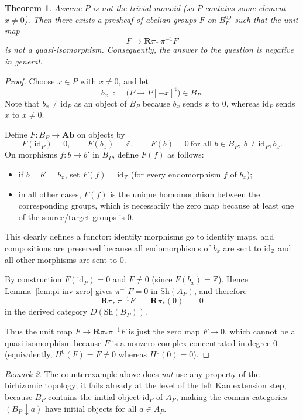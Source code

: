 \documentclass[11pt]{article}
\newtheorem{theorem}{Theorem}
\theoremstyle{remark}
\newtheorem{remark}[theorem]{Remark}
\begin{document}
\begin{theorem}\label{thm:counterexample}
Assume $P$ is not the trivial monoid (so $P$ contains some element $x\neq 0$).
Then there exists a presheaf of abelian groups $F$ on $B_P^{\mathrm{op}}$
such that the unit map
\[
F \longrightarrow \mathbf{R}\pi_*\,\pi^{-1}F
\]
is \emph{not} a quasi-isomorphism. Consequently, the answer to the question is \emph{negative in general}.
\end{theorem}

\begin{proof}
Choose $x\in P$ with $x\neq 0$, and let
\[
b_x \;:=\;\bigl(P\to P[-x]^\sharp\bigr)\in B_P.
\]
Note that $b_x\neq \mathrm{id}_P$ as an object of $B_P$ because $b_x$ sends $x$ to $0$, whereas
$\mathrm{id}_P$ sends $x$ to $x\neq 0$.

Define $F\colon B_P\to \mathbf{Ab}$ on objects by
\[
F(\mathrm{id}_P)=0,\qquad F(b_x)=\mathbb{Z},\qquad F(b)=0\ \text{for all }b\in B_P,\ b\neq \mathrm{id}_P,b_x.
\]
On morphisms $f\colon b\to b'$ in $B_P$, define $F(f)$ as follows:
\begin{itemize}
\item if $b=b'=b_x$, set $F(f)=\mathrm{id}_{\mathbb{Z}}$ (for every endomorphism $f$ of $b_x$);
\item in all other cases, $F(f)$ is the unique homomorphism between the corresponding groups, which is
necessarily the zero map because at least one of the source/target groups is $0$.
\end{itemize}
This clearly defines a functor: identity morphisms go to identity maps, and compositions are preserved
because all endomorphisms of $b_x$ are sent to $\mathrm{id}_{\mathbb{Z}}$ and all other morphisms
are sent to $0$.

By construction $F(\mathrm{id}_P)=0$ and $F\neq 0$ (since $F(b_x)=\mathbb{Z}$). Hence
Lemma~\ref{lem:pi-inv-zero} gives $\pi^{-1}F=0$ in $\mathrm{Sh}(A_P)$, and therefore
\[
\mathbf{R}\pi_*\,\pi^{-1}F \;=\; \mathbf{R}\pi_*(0)\;=\;0
\]
in the derived category $D(\mathrm{Sh}(B_P))$.

Thus the unit map $F\to \mathbf{R}\pi_*\pi^{-1}F$ is just the zero map $F\to 0$, which cannot be a quasi-isomorphism
because $F$ is a nonzero complex concentrated in degree $0$ (equivalently, $H^0(F)=F\neq 0$ whereas
$H^0(0)=0$).
\end{proof}

\begin{remark}
The counterexample above does \emph{not} use any property of the birhizomic topology; it fails already at the level
of the left Kan extension step, because $B_P$ contains the initial object $\mathrm{id}_P$ of $A_P$, making the
comma categories $(B_P\downarrow a)$ have initial objects for all $a\in A_P$.
\end{remark}
\end{document}

